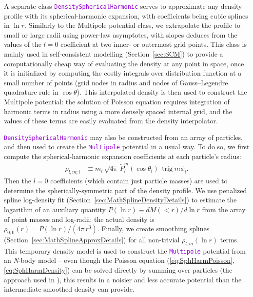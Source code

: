 \documentclass[12pt]{article}
\newcommand{\Nbody}{\textsl{N}-body\xspace}
\newcommand{\ttt}[1]{\textcolor{darkviolet}{\texttt{#1}}}
\DeclareMathOperator{\trig}{trig}
\begin{document}
A separate class \ttt{DensitySphericalHarmonic} serves to approximate any density profile with its spherical-harmonic expansion, with coefficients being cubic splines in $\ln r$. 
Similarly to the Multipole potential class, we extrapolate the profile to small or large radii using power-law asymptotes, with slopes deduces from the values of the $l=0$ coefficient at two inner- or outermost grid points. This class is mainly used in self-consistent modelling (Section~\ref{sec:SCM}) to provide a computationally cheap way of evaluating the density at any point in space, once it is initialized by computing the costly integrals over distribution function at a small number of points (grid nodes in radius and nodes of Gauss--Legendre quadrature rule in $\cos\theta$). This interpolated density is then used to construct the Multipole potential: the solution of Poisson equation requires integration of harmonic terms in radius using a more densely spaced internal grid, and the values of these terms are easily evaluated from the density interpolator. %

\ttt{DensitySphericalHarmonic} may also be constructed from an array of particles, and then used to create the \ttt{Multipole} potential in a usual way. To do so, we first compute the spherical-harmonic expansion coefficients at each particle's radius:
\begin{align*}
\rho_{l,m;i} &\equiv m_i\,\sqrt{4\pi}\,\tilde P_l^m(\cos\theta_i)\,\trig m\phi_i .
\end{align*}
Then the $l=0$ coefficients (which contain just particle masses) are used to determine the spherically-symmetric part of the density profile. We use penalized spline log-density fit (Section~\ref{sec:MathSplineDensityDetails}) to estimate the logarithm of an auxiliary quantity $P(\ln r) \equiv dM(<r)/d\ln r$ from the array of point masses and log-radii; the actual density is $\rho_{0,0}(r) = P(\ln r) / (4\pi\,r^3)$. Finally, we create smoothing splines (Section~\ref{sec:MathSplineApproxDetails}) for all non-trivial $\rho_{l,m}(\ln r)$ terms.
This temporary density model is used to construct the \ttt{Multipole} potential from an \Nbody model -- even though the Poisson equation (\ref{eq:SphHarmPoisson},\ref{eq:SphHarmDensity}) can be solved directly by summing over particles (the approach used in \cite{Vasiliev2013}), this results in a noisier and less accurate potential than the intermediate smoothed density can provide.
\end{document}
